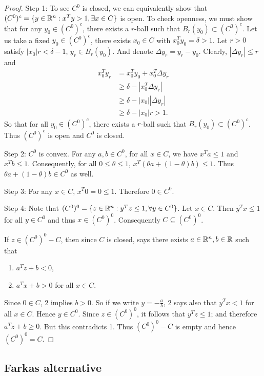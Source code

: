 \begin{proof}
Step 1:
To see $C^0$ is closed, we can equivalently show that $(C^0)^c = \{ y \in \mathbb{R}^n : x^T y > 1, \exists x \in C \}$ is open.
To check openness, we must show that for any $y_0 \in (C^0)^c$, there exists a $r$-ball such that $B_r(y_0) \subset (C^0)^c$.
Let us take a fixed $y_0 \in (C^0)^c$, there exists $x_0 \in C$ with $x_0^T y_0 = \delta > 1$.
Let $r > 0$ satisfy $|x_0| r < \delta - 1$, $y_r \in B_r(y_0)$.
And denote $\Delta y_r = y_r - y_0$.
Clearly, $|\Delta y_r| \le r$ and
\begin{align}
x_0^T y_r &= x_0^T y_0 + x_0^T \Delta y_r \\
& \ge \delta - |x_0^T \Delta y_r| \\
& \ge \delta - |x_0| |\Delta y_r| \\
& \ge \delta - |x_0| r > 1.
\end{align}
So that for all $y_0 \in (C^0)^c$, there exists a $r$-ball such that $B_r(y_0) \subset (C^0)^c$.
Thus $(C^0)^c$ is open and $C^0$ is closed.

Step 2:
$C^0$ is convex.
For any $a, b \in C^0$, for all $x \in C$, we have $x^T a \le 1$ and $x^T b \le 1$.
Consequently, for all $0 \le \theta \le 1$, $x^T (\theta a + (1-\theta) b) \le 1$.
Thus $\theta a + (1-\theta) b \in C^0$ as well.

Step 3:
For any $x \in C$, $x^T 0 = 0 \le 1$.
Therefore $0 \in C^0$.

Step 4:
Note that $(C^0)^0 = \{ z \in \mathbb{R}^n : y^T z \le 1, \forall y \in C^0 \}$.
Let $x \in C$. Then $y^T x \le 1$ for all $y \in C^0$ and thus $x \in (C^0)^0$. 
Consequently $C \subseteq (C^0)^0$.

If $z \in (C^0)^0 - C$, then since $C$ is closed,  says there exists $a \in \mathbb{R} ^n, b \in \mathbb{R}$ such that 
\begin{enumerate}
    \item $a^T z + b < 0$,
    \item $a^T x + b > 0$ for all $x \in C$.
\end{enumerate}
Since $0 \in C$, 2 implies $b > 0$.
So if we write $y = -\frac{a}{b}$, 2 says also that $y^T x < 1$ for all $x \in C$.
Hence $y \in C^0$.
Since $z \in (C^0)^0$, it follows that $y^T z \le 1$; and therefore $a^T z + b \ge 0$.
But this contradicts 1.
Thus $(C^0)^0-C$ is empty and hence $(C^0)^0 = C$.
\end{proof}

\subsection{Farkas alternative}

